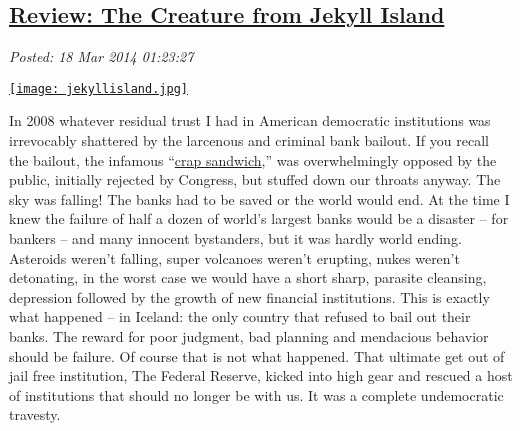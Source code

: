 %

\subsection*{\href{http://bakerjd99.wordpress.com/2014/03/17/review-the-creature-from-jekyll-island/}{Review: The Creature from Jekyll Island}}


\noindent\emph{Posted: 18 Mar 2014 01:23:27}
\vspace{6pt}

\captionsetup[floatingfigure]{labelformat=empty}
\begin{floatingfigure}[l]{0.222\textwidth}
\centering
\href{http://www.amazon.com/The-Creature-Jekyll-Island-Federal/dp/0912986212}{\texttt{[image: jekyllisland.jpg]}}
\label{fig:4568X0}
\end{floatingfigure} In
2008 whatever residual trust I had in American democratic institutions
was irrevocably shattered by the larcenous and criminal bank bailout. If
you recall the bailout, the infamous
``\href{http://abcnews.go.com/blogs/politics/2008/10/a-second-order/}{crap
sandwich},'' was overwhelmingly opposed by the public, initially
rejected by Congress, but stuffed down our throats anyway. The sky was
falling! The banks had to be saved or the world would end. At the time I
knew the failure of half a dozen of world's largest banks would be a
disaster -- for bankers -- and many innocent bystanders, but it was
hardly world ending. Asteroids weren't falling, super volcanoes weren't
erupting, nukes weren't detonating, in the worst case we would have a
short sharp, parasite cleansing, depression followed by the growth of
new financial institutions. This is exactly what happened -- in Iceland:
the only country that refused to bail out their banks. The reward for
poor judgment, bad planning and mendacious behavior should be failure.
Of course that is not what happened. That ultimate get out of jail free
institution, The Federal Reserve, kicked into high gear and rescued a
host of institutions that should no longer be with us. It was a complete
undemocratic travesty.

